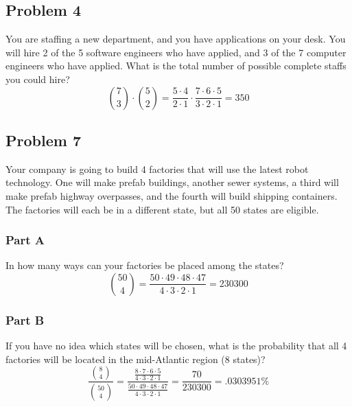 \documentclass{article}
\begin{document}
\subsection*{Problem 4}
You are staffing a new department, and you have applications on your desk. You will hire 2  of  the  5  software  engineers  who  have  applied,  and  3  of  the  7  computer  engineers  who  have applied. What is the total number of possible complete staffs you could hire?
\begin{equation}
   {7\choose{3}} \cdot {5\choose{2}} = \frac{5 \cdot 4}{2 \cdot 1} \cdot \frac{7 \cdot 6 \cdot 5}{3 \cdot 2 \cdot 1} = 350
\end{equation}
\newpage
\subsection*{Problem 7}
Your company is going to build 4 factories that will use the latest robot technology. One will make prefab buildings, another sewer systems, a third will make prefab highway overpasses, and the fourth will build shipping containers.  The factories will each be in a different state, but all 50 states are eligible.
\subsubsection*{Part A}
In how many ways can your factories be placed among the states?
\begin{equation}
    {50\choose{4}} = \frac{50 \cdot 49 \cdot 48 \cdot 47}{4 \cdot 3 \cdot 2 \cdot 1} = 230300
\end{equation}
\subsubsection*{Part B}
If you have no idea which states will be chosen, what is the probability that all 4 factories will be located in the mid-Atlantic region (8 states)?
\begin{equation}
    \frac{{8\choose{4}}}{{50\choose{4}}} = \frac{\frac{8 \cdot 7 \cdot 6 \cdot 5}{4 \cdot 3 \cdot 2 \cdot 1}}{\frac{50 \cdot 49 \cdot 48 \cdot 47}{4 \cdot 3 \cdot 2 \cdot 1}} = \frac{70}{230300} = .0303951\%
\end{equation}
\end{document}
